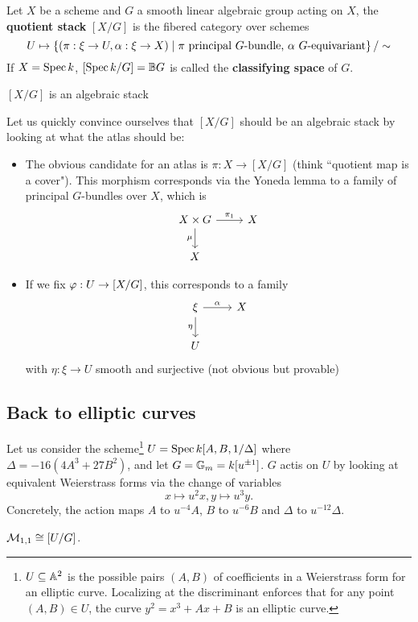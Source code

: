 \begin{definition}[]
Let $X$ be a scheme and $G$ a smooth linear algebraic group acting on $X$, the \textbf{quotient stack} $[X/G]$ is the fibered category over schemes
\[U\mapsto \left\{{(\pi:\xi\to U, \alpha:\xi\to X)\mid \pi\text{ principal $G$-bundle, $\alpha$ $G$-equivariant}}\right\}/\sim\]
If $X=\operatorname{Spec} k$, $[\operatorname{Spec} k/G]=\mathbb{B} G$ is called the \textbf{classifying space} of $G$.
\end{definition}



\begin{theorem}
    $[X/G]$ is an algebraic stack
\end{theorem}

Let us quickly convince ourselves that $[X/G]$ should be an algebraic stack by looking at what the atlas should be:
\setlength{\leftmargini}{0cm}
\begin{itemize}
\item[] The obvious candidate for an atlas is $\pi:X\to [X/G]$ (think ``quotient map is a cover"). This morphism corresponds via the Yoneda lemma to a family of principal $G$-bundles over $X$, which is
\[\begin{tikzcd}
	{X\times G} & X \\
	X
	\arrow["{\pi_1}", from=1-1, to=1-2]
	\arrow["\mu"', from=1-1, to=2-1]
\end{tikzcd}\]
\item[] If we fix $\varphi:U\to [X/G]$, this corresponds to a family
\[\begin{tikzcd}
	\xi & X \\
	U
	\arrow["\al", from=1-1, to=1-2]
	\arrow["\eta"', from=1-1, to=2-1]
\end{tikzcd}\]
with $\eta:\xi\to U$ smooth and surjective (not obvious but provable)
\end{itemize}
\setlength{\leftmargini}{0.5cm} 





\subsection{Back to elliptic curves}
Let us consider the scheme\footnote{$U\subseteq\mathbb{A}^2$ is the possible pairs $(A,B)$ of coefficients in a Weierstrass form for an elliptic curve. Localizing at the discriminant enforces that for any point $(A,B)\in U$, the curve $y^2=x^3+Ax+B$ is an elliptic curve.} $U=\operatorname{Spec} k[A,B,1/\Delta]$ where $\Delta=-16(4A^3+27B^2)$, and let $G=\mathbb{G}_m=k[u^{\pm 1}]$.
$G$ actis on $U$ by looking at equivalent Weierstrass forms via the change of variables
\[x\mapsto u^2 x, y\mapsto u^3 y.\]
Concretely, the action maps $A$ to $u^{-4}A$, $B$ to $u^{-6}B$ and $\Delta$ to $u^{-12}\Delta$.

\begin{fact}
$\mathcal{M}_{1,1}\cong [U/G]$.
\end{fact}







